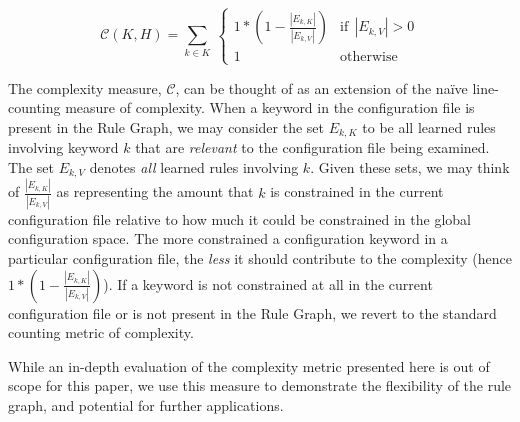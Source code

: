 \begin{equation}
    \mathcal{C}(K, H) = \sum_{k \in K} \
        \begin{cases}
            1 * (1 - \frac{|E_{k, K}|}{|E_{k, V}|}) & \text{if}\ \ |E_{k, V}| > 0 \\
            1 & \text{otherwise}
        \end{cases}
\end{equation}


The complexity measure, $\mathcal{C}$, can be thought of as an
extension of the na\"ive line-counting measure of complexity.
When a keyword in the configuration file is present in the Rule Graph,
we may consider the set $E_{k, K}$ to be all learned rules involving
keyword $k$ that
are {\it relevant} to the configuration file being examined. 
The set $E_{k, V}$ denotes {\it all} learned rules involving $k$.
Given these sets, we may think of $\frac{|E_{k, K}|}{|E_{k, V}|}$
as representing the amount that $k$ is constrained in the current
configuration file relative to how much it could be constrained
in the global configuration space. The more constrained a configuration
keyword in a particular configuration file, the {\it less} it should
contribute to the complexity (hence $1 * (1 - \frac{|E_{k, K}|}{|E_{k, V}|})$).
If a keyword is not constrained at all in the current configuration
file or is not present in the Rule Graph, we revert to the standard
counting metric of complexity. 

While an in-depth evaluation of the complexity metric presented here
is out of scope for this paper, we use this measure to
demonstrate the flexibility of the rule graph, and potential
for further applications.

